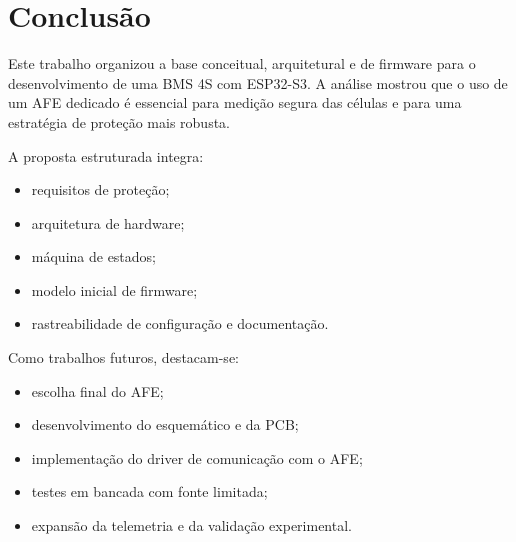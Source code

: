 \chapter{Conclusão}

Este trabalho organizou a base conceitual, arquitetural e de firmware para o desenvolvimento de
uma BMS 4S com ESP32-S3. A análise mostrou que o uso de um AFE dedicado é essencial para medição
segura das células e para uma estratégia de proteção mais robusta.

A proposta estruturada integra:

\begin{itemize}
  \item requisitos de proteção;
  \item arquitetura de hardware;
  \item máquina de estados;
  \item modelo inicial de firmware;
  \item rastreabilidade de configuração e documentação.
\end{itemize}

Como trabalhos futuros, destacam-se:

\begin{itemize}
  \item escolha final do AFE;
  \item desenvolvimento do esquemático e da PCB;
  \item implementação do driver de comunicação com o AFE;
  \item testes em bancada com fonte limitada;
  \item expansão da telemetria e da validação experimental.
\end{itemize}
